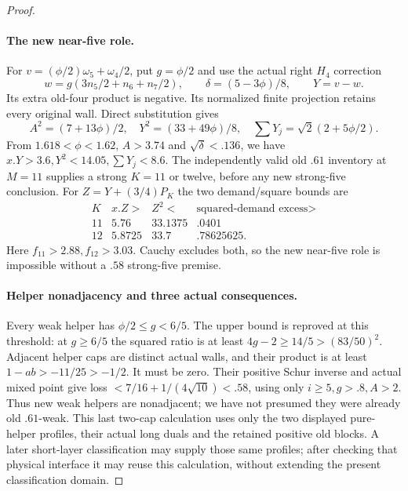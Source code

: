 \documentclass[11pt]{article}
\theoremstyle{definition}
\theoremstyle{remark}
\begin{document}
\begin{proof}
\paragraph{The new near-five role.}
For $v=(\phi/2)\omega_5+\omega_4/2$, put $g=\phi/2$ and use
the actual right $H_4$ correction
\[
 w=g(3n_5/2+n_6+n_7/2),\qquad
 \delta=(5-3\phi)/8,\qquad Y=v-w.
\]
Its extra old-four product is negative. Its normalized finite
projection retains every original wall. Direct substitution gives
\[
 A^2=(7+13\phi)/2,\quad Y^2=(33+49\phi)/8,\quad
 \sum Y_j=\sqrt2(2+5\phi/2).
\]
From $1.618<\phi<1.62$, $A>3.74$ and $\sqrt\delta<.136$,
we have $x.Y>3.6,Y^2<14.05,\sum Y_j<8.6$.
The independently valid old $.61$ inventory at $M=11$ supplies
a strong $K=11$ or twelve, before any new strong-five conclusion.
For $Z=Y+(3/4)P_K$ the two demand/square bounds are
\[
\begin{array}{c|c|c|c}
K&x.Z>&Z^2<&\text{squared-demand excess}>\\\hline
11&5.76&33.1375&.0401\\12&5.8725&33.7&.78625625 .
\end{array}
\]
Here $f_{11}>2.88,f_{12}>3.03$. Cauchy excludes both, so the
new near-five role is impossible without a $.58$ strong-five premise.

\paragraph{Helper nonadjacency and three actual consequences.}
Every weak helper has $\phi/2\le g<6/5$. The upper bound is
reproved at this threshold: at $g\ge6/5$ the squared ratio is at
least $4g-2\ge14/5>(83/50)^2$. Adjacent helper caps are distinct
actual walls, and their product is at least
$1-ab>-11/25>-1/2$. It must be zero. Their positive Schur inverse
and actual mixed point give loss
$<7/16+1/(4\sqrt{10})<.58$, using only $i\ge5,g>.8,A>2$.
Thus new weak helpers are nonadjacent; we have not presumed they
were already old $.61$-weak.
This last two-cap calculation uses only the two displayed pure-helper
profiles, their actual long duals and the retained positive old blocks.
A later short-layer classification may supply those same profiles;
after checking that physical interface it may reuse this calculation,
without extending the present classification domain.


\end{proof}
\end{document}
